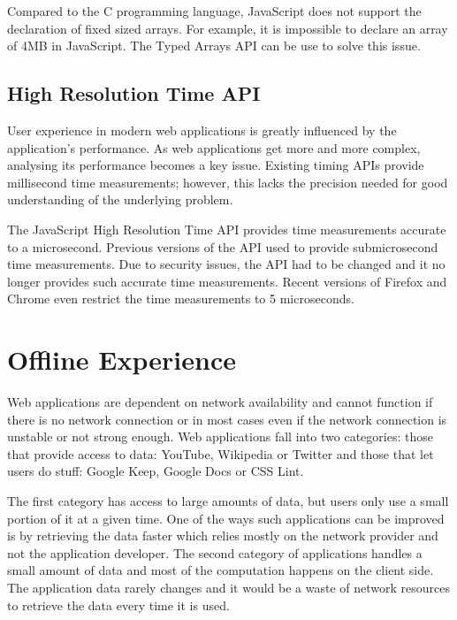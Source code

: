 \documentclass[10pt,a4paper,twoside]{book}
\begin{document}
Compared to the C programming language, JavaScript does not support the declaration of fixed sized arrays. For example, it is impossible to declare an array of 4MB in JavaScript. The Typed Arrays API can be use to solve this issue.


\subsection{High Resolution Time API}

User experience in modern web applications is greatly influenced by the application's performance. As web applications get more and more complex, analysing its performance becomes a key issue. Existing timing APIs provide millisecond time measurements; however, this lacks the precision needed for good understanding of the underlying problem.

The JavaScript High Resolution Time API \cite{jshighresolutiontimeapi} provides time measurements accurate to a microsecond. Previous versions of the API used to provide submicrosecond time measurements. Due to security issues, the API had to be changed and it no longer provides such accurate time measurements. Recent versions of Firefox and Chrome even restrict the time measurements to 5 microseconds.


\section{Offline Experience}
Web applications are dependent on network availability and cannot function if there is no network connection or in most cases even if the network connection is unstable or not strong enough. Web applications fall into two categories: those that provide access to data: YouTube, Wikipedia or Twitter and those that let users do stuff: Google Keep, Google Docs or CSS Lint.

The first category has access to large amounts of data, but users only use a small portion of it at a given time. One of the ways such applications can be improved is by retrieving the data faster which relies mostly on the network provider and not the application developer. The second category of applications handles a small amount of data and most of the computation happens on the client side. 	The application data rarely changes and it would be a waste of network resources to retrieve the data every time it is used. 
\end{document}
